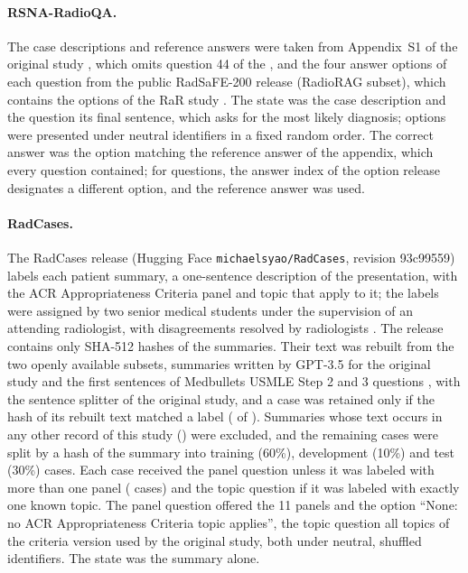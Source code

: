 \documentclass[11pt]{article}
\begin{document}
\paragraph{RSNA-RadioQA.} The case descriptions and reference answers were taken from Appendix~S1 of the original study \citep{tayebiarasteh2025radiorag}, which omits question 44 of the , and the four answer options of each question from the public RadSaFE-200 release (RadioRAG subset), which contains the options of the RaR study \citep{wind2025rar}. The state was the case description and the question its final sentence, which asks for the most likely diagnosis; options were presented under neutral identifiers in a fixed random order. The correct answer was the option matching the reference answer of the appendix, which every question contained; for  questions, the answer index of the option release designates a different option, and the reference answer was used.

\paragraph{RadCases.} The RadCases release (Hugging Face \texttt{michaelsyao/RadCases}, revision 93c99559) labels each patient summary, a one-sentence description of the presentation, with the ACR Appropriateness Criteria panel and topic that apply to it; the labels were assigned by two senior medical students under the supervision of an attending radiologist, with disagreements resolved by radiologists \citep{yao2025radcases}. The release contains only SHA-512 hashes of the summaries. Their text was rebuilt from the two openly available subsets, summaries written by GPT-3.5 for the original study and the first sentences of Medbullets USMLE Step 2 and 3 questions \citep{chen2024medbullets}, with the sentence splitter of the original study, and a case was retained only if the hash of its rebuilt text matched a label ( of ). Summaries whose text occurs in any other record of this study () were excluded, and the remaining cases were split by a hash of the summary into training (60\%), development (10\%) and test (30\%) cases. Each case received the panel question unless it was labeled with more than one panel ( cases) and the topic question if it was labeled with exactly one known topic. The panel question offered the 11 panels and the option ``None: no ACR Appropriateness Criteria topic applies'', the topic question all  topics of the criteria version used by the original study, both under neutral, shuffled identifiers. The state was the summary alone.
\end{document}
